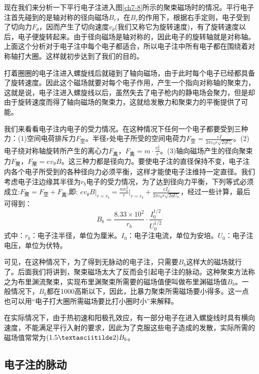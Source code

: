 现在我们来分析一下平行电子注进入图\ref{ch7-8}所示的聚束磁场时的情况。平行电子注首先碰到的是轴对称的径向磁场$ B_r $，在$ B_r $的作用下，根据右手定则，电子受到了切向力$ F_\theta $，因而产生了切向速度$ v_\theta $(我们又称它为旋转速度)，有了旋转速度以后，电子便旋转起来。由于径向磁场是轴对称的，因此电子的旋转轴就是对称轴。上面这个分析对于电子注中每个电子都适合，所以电子注中所有电子都在围绕着对称轴打大圈。这样就初步达到了我们的目的。

打着圈圈的电子注进入螺旋线后就碰到了轴向磁场，由于此时每个电子已经都具备了旋转速度。因此这个磁场就要对每个电子作用，产生一个指向对称轴的聚束力，这就是说，电子注进入螺旋线以后，虽然失去了电子枪内的静电场会聚力，但是却由于旋转速度而得了轴向磁场的聚束力，这就给发散力和聚束力的平衡提供了可能。

我们来看看电子注内电子的受力情况。在这种情况下任何一个电子都要受到三种力：(1)空间电荷排斥力$ F_{\textrm{空}} $。半径$ r $处电子所受的空间电荷力$ F_{\textrm{空}} = \frac{eI}{2\pi \varepsilon_0 r \sqrt{2\eta U_0}}$。(2)电子绕对称轴旋转所产生的离心力$ F_{\textrm{离}} $，$ F_{\textrm{离}} = m \cdot \frac{v_\theta^2}{r}$。(3)轴向磁场产生的径向聚束力$ F_{\textrm{聚}} $，$ F_{\textrm{聚}} = ev_\theta B$。这三种力都是径向力。要使电子注的直径保持不变，电子注内各个电子所受到的各种径向力必须平衡，这样才能使电子注维持一定直径。我们考虑电子注边缘其半径为$ r_b $电子的受力情况，为了达到径向力平衡，下列等式必须成立:$ F_{\textrm{聚}}= F_{\textrm{空}} + F_{\textrm{离}}$,即:
$ ev_\theta B \lvert_{r = r_b} = \frac{m v_\theta ^2}{r}\lvert_{r = r_b} + \frac{eI_0}{2\pi\varepsilon_0 r \sqrt{2\eta U_0}} $，经过一些计算，最后可得到：
\begin{equation}   \label{eq:ch7-5}
	B_b = \frac{8.33\times 10^2}{r_b}\cdot \frac{I_0^{1/2}}{U_0^{1/2}}
\end{equation}
式中：$ r_b $：电子注半径，单位为厘米。$ I_0 $：电子注电流，单位为安培。$ U_0 $：电子注电压，单位为伏特。

可见，在这种情况下，为了得到无脉动的电子注，只需要$ B_b $这样大的磁场就行了。后面我们将讲到，聚束磁场太大了反而会引起电子注的脉动。这种聚束方法称之为布里渊流聚束，实现布里渊聚束所需要的磁场值便叫做布里渊磁场值$ B_b $。一般情况下，$ B_b $都在1000高斯以下，因此，比暴力聚束所需磁场要小得多。这一点也可以用“电子打大圈所需磁场要比打小圈时小”来解释。

在实际情况下，由于热初速和阳极孔效应，有一部分电子在进入螺旋线时具有横向速度，不能满足平行入射的要求，因此为了克服这些电子造成的发散，实际所需的磁场值常常为$(1.5\textasciitilde2) B_b $。

\subsection{电子注的脉动}

